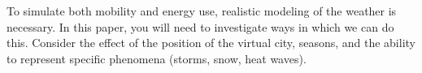 \documentclass[../paper.tex]{subfiles}
\begin{document}
To simulate both mobility and energy use, realistic modeling of the weather is necessary.
In this paper, you will need to investigate ways in which we can do this.
Consider the effect of the position of the virtual city, seasons, and the ability to represent specific phenomena (storms, snow, heat waves).
\end{document}
